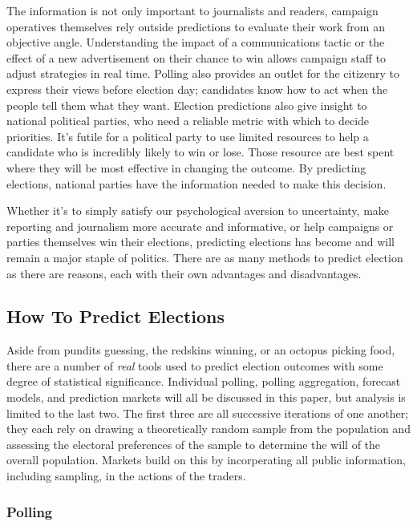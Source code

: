 \documentclass[]{article}
\begin{document}
The information is not only important to journalists and readers,
campaign operatives themselves rely outside predictions to evaluate
their work from an objective angle. Understanding the impact of a
communications tactic or the effect of a new advertisement on their
chance to win allows campaign staff to adjust strategies in real time.
Polling also provides an outlet for the citizenry to express their views
before election day; candidates know how to act when the people tell
them what they want. Election predictions also give insight to national
political parties, who need a reliable metric with which to decide
priorities. It's futile for a political party to use limited resources
to help a candidate who is incredibly likely to win or lose. Those
resource are best spent where they will be most effective in changing
the outcome. By predicting elections, national parties have the
information needed to make this decision.

Whether it's to simply satisfy our psychological aversion to
uncertainty, make reporting and journalism more accurate and
informative, or help campaigns or parties themselves win their
elections, predicting elections has become and will remain a major
staple of politics. There are as many methods to predict election as
there are reasons, each with their own advantages and disadvantages.

\subsection{How To Predict Elections}\label{how-to-predict-elections}

Aside from pundits guessing, the redskins winning, or an octopus picking
food, there are a number of \emph{real} tools used to predict election
outcomes with some degree of statistical significance. Individual
polling, polling aggregation, forecast models, and prediction markets
will all be discussed in this paper, but analysis is limited to the last
two. The first three are all successive iterations of one another; they
each rely on drawing a theoretically random sample from the population
and assessing the electoral preferences of the sample to determine the
will of the overall population. Markets build on this by incorperating
all public information, including sampling, in the actions of the
traders.

\subsubsection{Polling}\label{polling}
\end{document}
